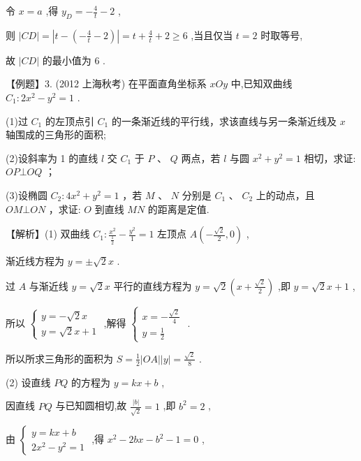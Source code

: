 \documentclass[10pt]{article}
\begin{document}
令 \(x = a\) ,得 \({y}_{D} =  - \frac{4}{t} - 2\) ,

则 \(\left| {CD}\right|  = \left| {t - \left( {-\frac{4}{t} - 2}\right) }\right|  = t + \frac{4}{t} + 2 \geq  6\) ,当且仅当 \(t = 2\) 时取等号,

故 \(\left| {CD}\right|\) 的最小值为 6 .

【例题】3. (2012 上海秋考) 在平面直角坐标系 \({xOy}\) 中,已知双曲线 \({C}_{1} : 2{x}^{2} - {y}^{2} = 1\) .

(1)过 \({C}_{1}\) 的左顶点引 \({C}_{1}\) 的一条渐近线的平行线，求该直线与另一条渐近线及 \(x\) 轴围成的三角形的面积;

(2)设斜率为 1 的直线 \(l\) 交 \({C}_{1}\) 于 \(P\) 、 \(Q\) 两点，若 \(l\) 与圆 \({x}^{2} + {y}^{2} = 1\) 相切，求证: \({OP}\bot {OQ}\) ；

(3)设椭圆 \({C}_{2} : 4{x}^{2} + {y}^{2} = 1\) ，若 \(M\) 、 \(N\) 分别是 \({C}_{1}\) 、 \({C}_{2}\) 上的动点，且 \({OM}\bot {ON}\) ，求证: \(O\) 到直线 \({MN}\) 的距离是定值.

【解析】(1) 双曲线 \({C}_{1} : \frac{{x}^{2}}{\frac{1}{2}} - \frac{{y}^{2}}{1} = 1\) 左顶点 \(A\left( {-\frac{\sqrt{2}}{2},0}\right)\) ,

渐近线方程为 \(y =  \pm  \sqrt{2}x\) .

过 \(A\) 与渐近线 \(y = \sqrt{2}x\) 平行的直线方程为 \(y = \sqrt{2}\left( {x + \frac{\sqrt{2}}{2}}\right)\) ,即 \(y = \sqrt{2}x + 1\) ,

所以 \(\left\{  \begin{array}{l} y =  - \sqrt{2}x \\  y = \sqrt{2}x + 1 \end{array}\right.\) ,解得 \(\left\{  \begin{array}{l} x =  - \frac{\sqrt{2}}{4} \\  y = \frac{1}{2} \end{array}\right.\) .

所以所求三角形的面积为 \(S = \frac{1}{2}\left| {OA}\right| \left| y\right|  = \frac{\sqrt{2}}{8}\) .

(2) 设直线 \({PQ}\) 的方程为 \(y = {kx} + b\) ,

因直线 \({PQ}\) 与已知圆相切,故 \(\frac{\left| b\right| }{\sqrt{2}} = 1\) ,即 \({b}^{2} = 2\) ,

由 \(\left\{  \begin{array}{l} y = {kx} + b \\  2{x}^{2} - {y}^{2} = 1 \end{array}\right.\) ,得 \({x}^{2} - {2bx} - {b}^{2} - 1 = 0\) ,
\end{document}
